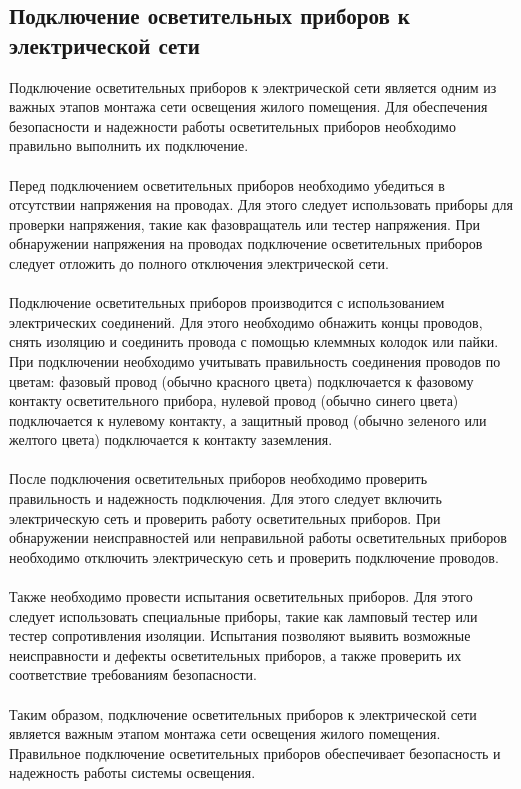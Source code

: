 \documentclass{article}
\begin{document}
\subsection{Подключение осветительных приборов к электрической сети}
Подключение осветительных приборов к электрической сети является одним из важных этапов монтажа сети освещения жилого помещения. Для обеспечения безопасности и надежности работы осветительных приборов необходимо правильно выполнить их подключение.\\
~\\
Перед подключением осветительных приборов необходимо убедиться в отсутствии напряжения на проводах. Для этого следует использовать приборы для проверки напряжения, такие как фазовращатель или тестер напряжения. При обнаружении напряжения на проводах подключение осветительных приборов следует отложить до полного отключения электрической сети.\\
~\\
Подключение осветительных приборов производится с использованием электрических соединений. Для этого необходимо обнажить концы проводов, снять изоляцию и соединить провода с помощью клеммных колодок или пайки. При подключении необходимо учитывать правильность соединения проводов по цветам: фазовый провод (обычно красного цвета) подключается к фазовому контакту осветительного прибора, нулевой провод (обычно синего цвета) подключается к нулевому контакту, а защитный провод (обычно зеленого или желтого цвета) подключается к контакту заземления.\\
~\\
После подключения осветительных приборов необходимо проверить правильность и надежность подключения. Для этого следует включить электрическую сеть и проверить работу осветительных приборов. При обнаружении неисправностей или неправильной работы осветительных приборов необходимо отключить электрическую сеть и проверить подключение проводов.\\
~\\
Также необходимо провести испытания осветительных приборов. Для этого следует использовать специальные приборы, такие как ламповый тестер или тестер сопротивления изоляции. Испытания позволяют выявить возможные неисправности и дефекты осветительных приборов, а также проверить их соответствие требованиям безопасности.\\
~\\
Таким образом, подключение осветительных приборов к электрической сети является важным этапом монтажа сети освещения жилого помещения. Правильное подключение осветительных приборов обеспечивает безопасность и надежность работы системы освещения.\\
~\\
\end{document}
